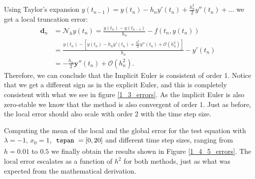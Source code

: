 Using Taylor's expansion $y(t_{n-1}) = y(t_n) - h_n y'(t_n) + \frac{h_n^2}{2}y''(t_n) + \ldots$ we get a local truncation error:
\begin{align*}
    \mathbf{d}_n &= \mathcal{N}_h y(t_n) = \frac{y(t_n) - y(t_{n-1})}{h_n} - f(t_n, y(t_n)) \\
    &= \frac{y(t_n) - \left[ y(t_n) - h_n y'(t_n) + \frac{h_n^2}{2}y''(t_n) + \mathcal{O}(h_n^3) \right]}{h_n} - y'(t_n) \\
    &= - \frac{h_n}{2}\mathbf{y}''(t_n) + \mathcal{O}(h_n^2).
\end{align*}
Therefore, we can conclude that the Implicit Euler is consistent of order 1. Notice that we get a different sign as in the explicit Euler, and this is completely consistent with what we see in figure \ref{1_3_errors}. As the implicit Euler is also zero-stable we know that the method is also convergent of order 1. Just as before, the local error should also scale with order 2 with the time step size.

Computing the mean of the local and the global error for the test equation with $\lambda=-1$, $x_0 = 1$, $\code{tspan}=[0, 20]$ and different time step sizes, ranging from $h=0.01$ to $0.5$ we finally obtain the results shown in Figure \ref{1_4_5_errors}. The local error escalates as a function of $h^2$ for both methods, just as what was expected from the mathematical derivation. 

